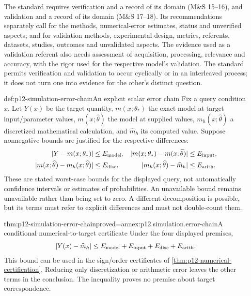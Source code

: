 The standard requires verification and a record of its domain
(M\&S 15--16), and validation and a record of its domain
(M\&S 17--18). Its recommendations separately call for the methods,
numerical-error estimates, status and unverified aspects; and for
validation methods, experimental design, metrics, referents, datasets,
studies, outcomes and unvalidated aspects. The evidence used as a
validation referent also needs assessment of acquisition, processing,
relevance and accuracy, with the rigor used for the respective model's
validation. The standard permits verification and
validation to occur cyclically or in an interleaved process; it does
not turn one into evidence for the other's distinct question.
\cite[Sections 4.2.3--4.2.6]{NASA7009B2024}

\begin{hbdefinition}{def:p12-simulation-error-chain}{An explicit scalar error chain}
Fix a query condition \(x\). Let \(Y(x)\) be the target quantity,
\(m(x;\theta_*)\) the exact model at target input/parameter values,
\(m(x;\widehat\theta)\) the model at supplied values,
\(m_h(x;\widehat\theta)\) a discretized mathematical calculation,
and \(\widehat m_h\) its computed value. Suppose nonnegative
bounds are justified for the respective differences:
\[
\begin{aligned}
 |Y-m(x;\theta_*)|&\leq E_{\rm model},&
 |m(x;\theta_*)-m(x;\widehat\theta)|&\leq E_{\rm input},\\
 |m(x;\widehat\theta)-m_h(x;\widehat\theta)|&\leq E_{\rm disc},&
 |m_h(x;\widehat\theta)-\widehat m_h|&\leq E_{\rm arith}.
\end{aligned}
\]
These are stated worst-case bounds for the displayed query, not
automatically confidence intervals or estimates of probabilities.
An unavailable bound remains unavailable rather than being set to
zero. A different decomposition is possible, but its terms must
refer to explicit differences and must not double-count them.
\end{hbdefinition}

\begin{hbtheorem}{thm:p12-simulation-error-chain}{proved=annex:p12.simulation.error-chain}{A conditional numerical-to-target certificate}
Under the four displayed premises,
\[
 |Y(x)-\widehat m_h|\leq
 E_{\rm model}+E_{\rm input}+E_{\rm disc}+E_{\rm arith}.
\]
This bound can be used in the sign/order certificates of
\cref{thm:p12-numerical-certification}. Reducing only discretization
or arithmetic error leaves the other terms in the conclusion.
The inequality proves no premise about target correspondence.
\end{hbtheorem}

